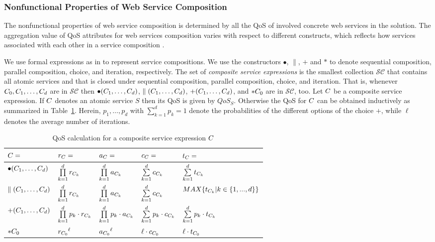 \subsubsection{Nonfunctional Properties of Web Service Composition}
The nonfunctional properties of web service composition is determined by all the QoS of involved concrete web services in the solution. The aggregation value of QoS attributes for web services composition varies with respect to different constructs, which reflects how services associated with each other in a service composition \cite{zeng2003quality}.

We use formal expressions as in \cite{ma2012formal} to represent service compositions. We use the constructors $\bullet$, $\parallel$, $+$ and $\ast$ to denote sequential composition, parallel composition, choice, and iteration, respectively. The set of \emph{composite service expressions} is the smallest collection $\mathcal{SC}$ that contains all atomic services and that is closed under sequential composition, parallel composition, choice, and iteration. That is, whenever $C_0,C_1,\ldots,C_d$ are in $\mathcal{SC}$ then $\bullet(C_1,\ldots,C_d)$, $\parallel(C_1,\ldots,C_d)$, $+(C_1,\ldots,C_d)$, and $\ast C_0$ are in $\mathcal{SC}$, too. Let $C$ be a composite service expression. If $C$ denotes an atomic service $S$ then its QoS is given by $QoS_S$.  Otherwise the QoS for $C$ can be obtained inductively as summarized in Table~\ref{tbl:QoS_Aggre}. Herein, $p_1,\ldots,p_d$ with $\sum\limits^d_{k=1}p_k=1$ denote the probabilities of the different options of the choice $+$, while $\ell$ denotes the average number of iterations.

\begin{table}[htb]
\centering
\caption{QoS calculation for a composite service expression $C$}
\begin{tabular}{l|l|l|l|l}
\hline
 $C=$       &$r_C=$                              &$a_C=$                              &$c_C=$                            &$t_C=$ \\ \hline
 $\bullet(C_1,\ldots,C_d)$      &$\prod\limits^d_{k=1}r_{C_k}$    &$\prod\limits^d_{k=1}a_{C_k}$    &$\sum\limits^d_{k=1}c_{C_k}$   &$\sum\limits^d_{k=1}t_{C_k}$  \\ \hline
 $\parallel(C_1,\ldots,C_d)$  &$\prod\limits^d_{k=1}r_{C_k}$    &$\prod\limits^d_{k=1}a_{C_k}$    &$\sum\limits^d_{k=1}c_{C_k}$   &$MAX \{ t_{C_k} | k \in \{ 1,...,d \} \}$\\ \hline
 $+(C_1,\ldots,C_d)$     &$\prod\limits^d_{k=1}p_k\cdot r_{C_k}$    &$\prod\limits^d_{k=1}p_k\cdot a_{C_k}$    &$\sum\limits^d_{k=1}p_k\cdot c_{C_k}$   &$\sum\limits^d_{k=1}p_k\cdot t_{C_k}$  \\ \hline
 $\ast C_0$         &${r_{C_0}}^\ell$  &${a_{C_0}}^\ell$  &$\ell\cdot c_{C_0}$ &$\ell\cdot t_{C_0}$ \\ \hline
\end{tabular}
\label{tbl:QoS_Aggre}
\end{table}

